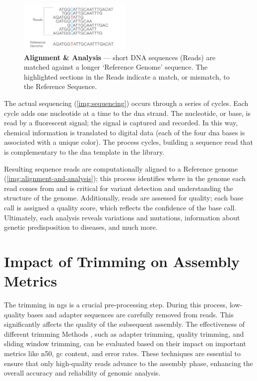 \begin{figure}
  \centering
  \includegraphics[width=0.48\textwidth]{resources/images/Alignment and Data Analysis.png}
  \caption{\textbf{Alignment \& Analysis} \cite{Illumina2017-ADA} — short DNA sequences (Reads) are matched against a longer ‘Reference Genome’ sequence. The highlighted sections in the Reads indicate a match, or mismatch, to the Reference Sequence.}
  \label{img:alignment-and-analysis}
\end{figure}

The actual \gls{sequencing} (\autoref{img:sequencing}) occurs through a series of cycles. Each cycle adds one nucleotide at a time to the \gls{dna} strand. The nucleotide, or base, is read by a fluorescent signal; the signal is captured and recorded. In this way, chemical information is translated to digital data (each of the four \gls{dna} bases is associated with a unique color). The process cycles, building a sequence read that is complementary to the \gls{dna} template in the library.

Resulting sequence reads are computationally aligned to a Reference \gls{genome} (\autoref{img:alignment-and-analysis}); this process identifies where in the \gls{genome} each \gls{read} comes from and is critical for variant detection and understanding the structure of the \gls{genome}. Additionally, \gls{read}s are assessed for quality; each base call is assigned a quality score, which reflects the confidence of the base call. Ultimately, each analysis reveals variations and mutations, information about genetic predisposition to diseases, and much more.

\section{Impact of Trimming on Assembly Metrics}

The \gls{trimming} in \gls{ngs} is a crucial pre-processing step. During this process, low-quality bases and adapter sequences are carefully removed from \gls{read}s. This significantly affects the quality of the subsequent \gls{assembly}. The effectiveness of different \gls{trimming} Methods \cite{fastp}, such as adapter trimming, quality trimming, and sliding window trimming, can be evaluated based on their impact on important \gls{metrics} like \gls{n50}, \gls{gc} content, and error rates. These techniques are essential to ensure that only high-quality \gls{read}s advance to the \gls{assembly} phase, enhancing the overall accuracy and reliability of genomic analysis.

